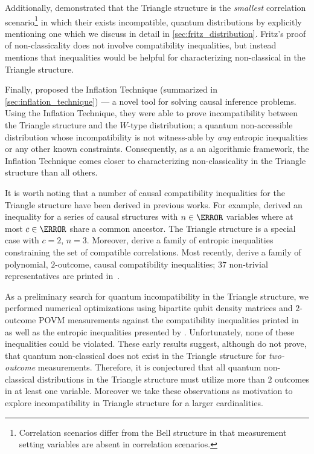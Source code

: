 \documentclass[aps, 10pt, english, twoside, pra, nofootinbib, tightenlines, longbibliography, superscriptaddress]{revtex4-1}
\begin{document}
    Additionally, \citet{Fritz_2012} demonstrated that the Triangle structure is the \textit{smallest} correlation scenario\footnote{Correlation scenarios differ from the Bell structure in that measurement setting variables are absent in correlation scenarios.} in which their exists incompatible, quantum distributions by explicitly mentioning one which we discuss in detail in \cref{sec:fritz_distribution}. Fritz's proof of non-classicality does not involve compatibility inequalities, but instead mentions that inequalities would be helpful for characterizing non-classical in the Triangle structure.

    Finally, \citet{Inflation} proposed the Inflation Technique (summarized in \cref{sec:inflation_technique}) --- a novel tool for solving causal inference problems. Using the Inflation Technique, they were able to prove incompatibility between the Triangle structure and the $W$-type distribution; a quantum non-accessible distribution whose incompatibility is not witness-able by \textit{any} entropic inequalities or any other known constraints. Consequently, as a an algorithmic framework, the Inflation Technique comes closer to characterizing non-classicality in the Triangle structure than all others.

    It is worth noting that a number of causal compatibility inequalities for the Triangle structure have been derived in previous works. For example, \citet{Steudel_2010} derived an inequality for a series of causal structures with $n \in \N$ variables where at most $c \in \N$ share a common ancestor. The Triangle structure is a special case with $c = 2$, $n = 3$. Moreover, \citet{Henson_2014} derive a family of entropic inequalities constraining the set of compatible correlations. Most recently, \citet{Inflation} derive a family of polynomial, $2$-outcome, causal compatibility inequalities; $37$ non-trivial representatives are printed in~\cite{Inflation}.

    As a preliminary search for quantum incompatibility in the Triangle structure, we performed numerical optimizations using bipartite qubit density matrices and $2$-outcome POVM measurements against the compatibility inequalities printed in~\cite{Inflation} as well as the entropic inequalities presented by \citet{Henson_2014}. Unfortunately, none of these inequalities could be violated. These early results suggest, although do not prove, that quantum non-classical does not exist in the Triangle structure for \textit{two-outcome} measurements. Therefore, it is conjectured that all quantum non-classical distributions in the Triangle structure must utilize more than $2$ outcomes in at least one variable. Moreover we take these observations as motivation to explore incompatibility in Triangle structure for a larger cardinalities.
\end{document}
